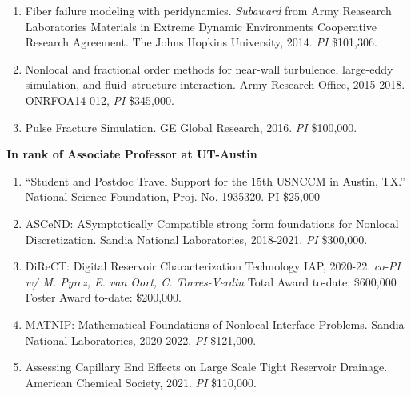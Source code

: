 \begin{enumerate}
  \item Fiber failure modeling with peridynamics. \textit{Subaward} from Army Reasearch Laboratories Materials in Extreme Dynamic Environments Cooperative Research Agreement.  The Johns Hopkins University, 2014. \textit{PI} \$101,306.
  \item Nonlocal and fractional order methods for near-wall turbulence, large-eddy simulation, and fluid--structure interaction. Army Research Office, 2015-2018. ONRFOA14-012, \textit{PI} {\$}345,000.
  \item Pulse Fracture Simulation. GE Global Research, 2016. \textit{PI} \$100,000.
\end{enumerate}
    \pagebreak[2]
    \textbf{In rank of Associate Professor at UT-Austin}
\begin{enumerate}[resume]
    \item ``Student and Postdoc Travel Support for the 15th USNCCM in Austin, TX.''  National Science Foundation, Proj. No. 1935320. PI \$25,000
    \item ASCeND: ASymptotically Compatible strong form foundations for Nonlocal Discretization. Sandia National Laboratories, 2018-2021. \textit{PI} \$300,000.
    \item DiReCT: Digital Reservoir Characterization Technology IAP, 2020-22. \textit{co-PI w/ M. Pyrcz, E. van Oort, C. Torres-Verdin} Total Award to-date: \$600,000 Foster Award to-date: \$200,000.
    \item MATNIP: Mathematical Foundations of Nonlocal Interface Problems. Sandia National Laboratories, 2020-2022. \textit{PI} \$121,000. 
    \item Assessing Capillary End Effects on Large Scale Tight Reservoir Drainage.  American Chemical Society, 2021. \textit{PI} \$110,000.
\end{enumerate}
\else
\ifdefined\ispdf
